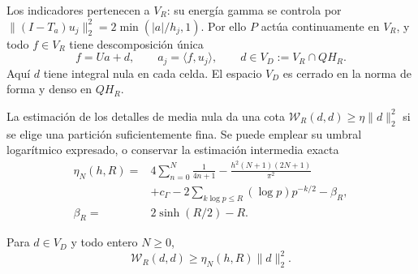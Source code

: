 Los indicadores pertenecen a \(V_R\): su energía gamma se controla por
\(\|(I-T_a)u_j\|_2^2=2\min(|a|/h_j,1)\). Por ello \(P\) actúa
continuamente en \(V_R\), y todo \(f\in V_R\) tiene descomposición única
\begin{equation}
f=Ua+d,\qquad a_j=\langle f,u_j\rangle,\qquad
d\in V_D:=V_R\cap QH_R.
\label{schur-add-display-4}
\end{equation}
Aquí \(d\) tiene integral nula en cada celda. El espacio \(V_D\) es
cerrado en la norma de forma y denso en \(QH_R\).

La estimación de los detalles de media nula da una cota \(\mathscr W_R(d,d)\geq\eta\|d\|_2^2\)
si se elige una partición suficientemente fina. Se puede emplear su
umbral logarítmico expresado, o conservar la estimación intermedia exacta
\begin{equation}
\begin{aligned}
\eta_N(h,R)={}&4\sum_{n=0}^N\frac1{4n+1}
-\frac{h^2(N+1)(2N+1)}{\pi^2}\\
&+c_\Gamma-2\sum_{k\log p\leq R}(\log p)p^{-k/2}-\beta_R,\\
\beta_R={}&2\sinh(R/2)-R.
\end{aligned}
\label{schur-add-eq-S1}
\end{equation}
\begin{lemma}
\label{schur-add-retencion-detalles}
Para \(d\in V_D\) y todo entero \(N\geq0\),
\[
\mathscr W_R(d,d)\geq\eta_N(h,R)\|d\|_2^2.
\]
\end{lemma}
